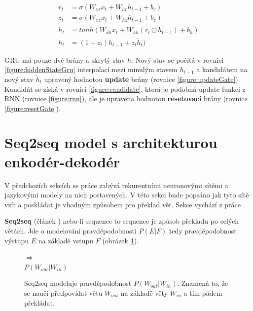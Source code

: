 \begin{align}
    r_{t}&=\sigma(W_{xr}x_{t}+W_{hr}h_{t-1}+b_{r}) \label{figure:resetGate} \\
    z_{t}&=\sigma(W_{xz}x_{t}+W_{hz}h_{t-1}+b_{z}) \label{figure:updateGate} \\
    \tilde{h}_{t}&=tanh(W_{xh}x_t + W_{hh}(r_t \odot h_{t-1}) + b_h) \label{figure:candidate} \\
    h_{t}&=(1 - z_t)h_{t-1} + z_{t}\tilde{h}_{t}) \label{figure:hiddenStateGru}
\end{align}

GRU má pouze dvě brány a skrytý stav $h$. Nový stav se počítá v rovnici \ref{figure:hiddenStateGru} interpolací mezi minulým stavem $h_{t-1}$ a kandidátem na nový stav $\tilde{h}_{t}$ upravený hodnotou \textbf{update} brány (rovnice \ref{figure:updateGate}). Kandidát se získá v rovnici \ref{figure:candidate}, která je podobná update funkci z RNN (rovnice \ref{figure:rnn}), ale je upravena hodnotou \textbf{resetovací} brány (rovnice \ref{figure:resetGate}).



\section{Seq2seq model s architekturou enkodér-dekodér} \label{section:encoderdecoder}
V předchozích sekcích se práce zabývá rekurentními neuronovými sítěmi a jazykovými modely na nich postavených. V této sekci bude popsáno jak tyto sítě vzít a poskládat je vhodným způsobem pro překlad vět. Sekce vychází z práce \cite{nmtTutorial}.

\textbf{Seq2seq} (článek \cite{seq2seq}) nebo-li sequence to sequence je způsob překladu po celých větách. Jde o modelování pravděpodobnosti $P(E|F)$ tedy pravděpodobnost výstupu $E$ na základě vstupu $F$ (obrázek \ref{figure:seqProbability}).

\begin{figure}[H]
    \begin{center}
        \setlength{\fboxsep}{8pt}
        $\Longrightarrow$
        \\ \vspace{5mm}
        $P(W_{out}|W_{in})$
    \end{center}
	\caption{Seq2seq modeluje pravděpodobnost $P(W_{out}|W_{in})$. Znamená to, že se naučí předpovídat větu $W_{out}$ na základě věty $W_{in}$ a tím pádem překládat.}
	\label{figure:seqProbability}
\end{figure}

